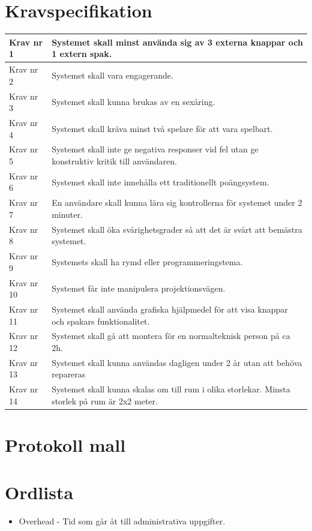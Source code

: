 \documentclass[a4paper,12pt,oneside,final]{extbook}
\begin{document}
\chapter{Kravspecifikation}\label{Kravspecifikation}
\begin{center}
	\begin{tabular}{ | m{5em} | m{30em}| } 
		\hline
		Krav nr 1& Systemet skall minst använda sig av 3 externa knappar och 1 extern spak.   \\ 
		\hline
		Krav nr 2 & Systemet skall vara engagerande.  \\ 
		\hline
		Krav nr 3 & Systemet skall kunna brukas av en sexåring. \\ 
		\hline
		Krav nr 4& Systemet skall kräva minst två spelare för att vara spelbart. \\ 
		\hline
		Krav nr 5 & Systemet skall inte ge negativa responser vid fel utan ge konstruktiv kritik till användaren. \\ 
		\hline
		Krav nr 6 & Systemet skall inte innehålla ett traditionellt poängsystem. \\ 
		\hline
		Krav nr 7& En användare skall kunna lära sig kontrollerna för systemet under 2 minuter. \\ 
		\hline
		Krav nr 8 & Systemet skall öka svårighetsgrader så att det är svårt att bemästra systemet. \\ 
		\hline
		Krav nr 9 & Systemets skall ha rymd eller programmeringstema. \\ 
		\hline
		Krav nr 10& Systemet får inte manipulera projektionsvägen. \\ 
		\hline
		Krav nr 11& Systemet skall använda grafiska hjälpmedel för att visa knappar och spakars funktionalitet.  \\ 
		\hline
		Krav nr 12& Systemet skall gå att montera för en normalteknisk person på ca 2h. \\ 
		\hline
		Krav nr 13& Systemet skall kunna användas dagligen under 2 år utan att behöva repareras \\ 
		\hline
		Krav nr 14 & Systemet skall kunna skalas om till rum i olika storlekar. Minsta storlek på rum är 2x2 meter. \\ 
		\hline
	\end{tabular}
\end{center}


\chapter{Protokoll mall}\label{protokoll}

\chapter{Ordlista}\label{Ordlista}
\begin{itemize}
	\item Overhead - Tid som går åt till administrativa uppgifter. 
\end{itemize}
\end{document}
